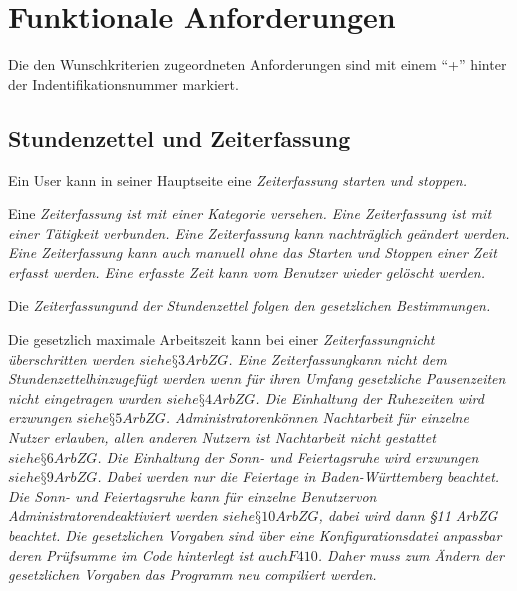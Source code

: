 \section{Funktionale Anforderungen}

Die den Wunschkriterien zugeordneten Anforderungen sind mit einem "`+"' hinter der Indentifikationsnummer markiert.

\subsection{Stundenzettel und Zeiterfassung}

\begin{requirements}
    Ein User kann in seiner Hauptseite eine \em Zeiterfassung \em starten und stoppen.
    \begin{requirements}
         Eine \em Zeiterfassung \em ist mit einer \em Kategorie \em versehen.
         Eine \em Zeiterfassung \em ist mit einer \em Tätigkeit \em verbunden.
         Eine \em Zeiterfassung \em kann nachträglich geändert werden.
         Eine \em Zeiterfassung \em kann auch manuell ohne das Starten und Stoppen einer Zeit erfasst werden.
         Eine erfasste Zeit kann vom \em Benutzer \em wieder gelöscht werden.
    \end{requirements}

    Die \em Zeiterfassung\em und der \em Stundenzettel \em folgen den gesetzlichen Bestimmungen.
    \begin{requirements}
         Die gesetzlich maximale Arbeitszeit kann bei einer \em Zeiterfassung\em nicht überschritten werden \em \(siehe §3 ArbZG\)\em.
         Eine \em Zeiterfassung\em kann nicht dem \em Stundenzettel\em hinzugefügt werden wenn für ihren Umfang gesetzliche Pausenzeiten nicht eingetragen wurden \em \(siehe §4 ArbZG\)\em.
         Die Einhaltung der Ruhezeiten wird erzwungen \em \(siehe §5 ArbZG\)\em.
         \em Administratoren\em können Nachtarbeit für einzelne Nutzer erlauben, allen anderen Nutzern ist Nachtarbeit nicht gestattet \em \(siehe §6 ArbZG\)\em.
         Die Einhaltung der Sonn- und Feiertagsruhe wird erzwungen \em \(siehe §9 ArbZG\)\em.
		Dabei werden nur die Feiertage in Baden-Württemberg beachtet.
                Die Sonn- und Feiertagsruhe kann für einzelne \em Benutzer\em von \em Administratoren\em deaktiviert werden \em \(siehe §10 ArbZG\)\em, dabei wird dann §11 ArbZG beachtet.
         Die gesetzlichen Vorgaben sind über eine Konfigurationsdatei anpassbar deren Prüfsumme im Code hinterlegt ist \em \(auch F410\)\em.
                Daher muss zum Ändern der gesetzlichen Vorgaben das Programm neu compiliert werden.
    \end{requirements}


\end{requirements}
